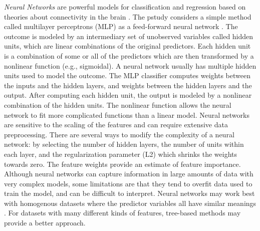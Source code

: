 \documentclass[sigconf]{acmart}
\begin{document}
\emph{Neural Networks} are powerful models for classification and 
regression based on theories about connectivity in the brain \cite{kuhn13}. 
The pstudy considers a simple method called multilayer perceptrons 
(MLP) as a feed-forward neural network \cite{muller17, raschka17}. 
The outcome is modeled by an intermediary set of unobserved variables called 
hidden units, which are linear combinations of the original predictors. 
Each hidden unit is a combination of some or all of the predictors which 
are then transformed by a nonlinear function (e.g., sigmoidal). A neural 
network usually has multiple hidden units used to model the outcome. 
The MLP classifier computes weights between the inputs and the hidden layers, 
and weights between the hidden layers and the output. After computing each 
hidden unit, the output is modeled by a nonlinear combination of the hidden 
units. The nonlinear function allows the neural network to fit more 
complicated functions than a linear model. Neural networks are sensitive to 
the scaling of the features and can require extensive data preprocessing. 
There are several ways to modify the complexity of a neural network: by 
selecting the number of hidden layers, the number of units within each 
layer, and the regularization parameter (L2) which shrinks the weights 
towards zero. The feature weights provide an estimate of feature importance.
Although neural networks can capture information in large amounts of data 
with very complex models, some limitations are that they tend to overfit 
data used to train the model, and can be difficult to interpret. Neural
networks may work best with homogenous datasets where the predictor variables
all have similar meanings \cite{muhuri13}. For datasets with many different
kinds of features, tree-based methods may provide a better approach.

\end{document}
